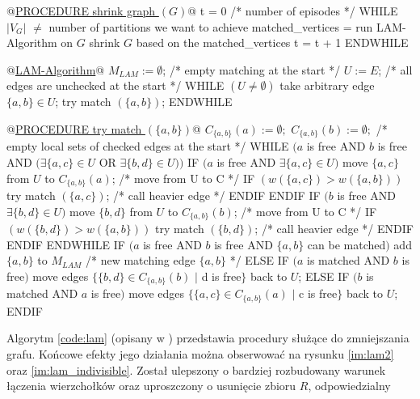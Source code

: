 \newpage
\begin{pseudocode}
@\underline{PROCEDURE shrink graph $(G)$}@
  t = 0 /* number of episodes */
  WHILE $|V_{G}|$ $\neq$ number of partitions we want to achieve
    matched_vertices = run LAM-Algorithm on $G$
    shrink $G$ based on the matched_vertices
    t = t + 1
  ENDWHILE


@\underline{LAM-Algorithm}@
  $M_{LAM} := \emptyset$; /* empty matching at the start */
  $U := E$; /* all edges are unchecked at the start */
  WHILE $(U \neq \emptyset)$
    take arbitrary edge $\{a,b\} \in U$;
    try match $(\{a,b\})$;
  ENDWHILE


@\underline{PROCEDURE try match $(\{a,b\})$}@
  $C_{\{a,b\}}(a) := \emptyset;$ $ C_{\{a,b\}}(b) := \emptyset;$ /* empty local sets of checked edges at the start */
  WHILE $(a$ is free AND $b$ is free AND $(\exists \{a,c\} \in U$ OR $\exists \{b,d\} \in U))$
    IF $(a$ is free AND $\exists \{a,c\} \in U)$
      move $\{a,c\}$ from $U$ to $C_{\{a,b\}}(a)$; /* move from U to C */
      IF $(w(\{a,c\}) > w(\{a,b\}))$
        try match $(\{a,c\})$; /* call heavier edge */
      ENDIF
    ENDIF
    IF $(b$ is free AND $\exists \{b,d\} \in U)$
      move $\{b,d\}$ from $U$ to $C_{\{a,b\}}(b)$; /* move from U to C */
      IF $(w(\{b,d\}) > w(\{a,b\}))$
        try match $(\{b,d\})$; /* call heavier edge */
      ENDIF
    ENDIF
  ENDWHILE
  IF $(a$ is free AND $b$ is free AND $\{a,b\}$ can be matched$)$
    add $\{a,b\}$ to $M_{LAM}$  /* new matching edge $\{a,b\}$ */
  ELSE IF $(a$ is matched AND $b$ is free$)$
    move edges $\{ \{b,d\} \in C_{\{a,b\}}(b)$ $|$ d is free$\}$ back to $U$;
  ELSE IF $(b$ is matched AND $a$ is free$)$
    move edges $\{ \{a,c\} \in C_{\{a,b\}}(a)$ $|$ c is free$\}$ back to $U$;
  ENDIF
\end{pseudocode}
\vspace{-8mm}
\label{code:lam}
\newpage
Algorytm \ref{code:lam} (opisany w \cite{weighted_maching}) przedstawia procedury służące do zmniejszania grafu.
Końcowe efekty jego działania można obserwować na rysunku \ref{im:lam2} oraz \ref{im:lam_indivisible}.
Został ulepszony o bardziej rozbudowany warunek łączenia wierzchołków oraz uproszczony o usunięcie zbioru $R$, odpowiedzialny
